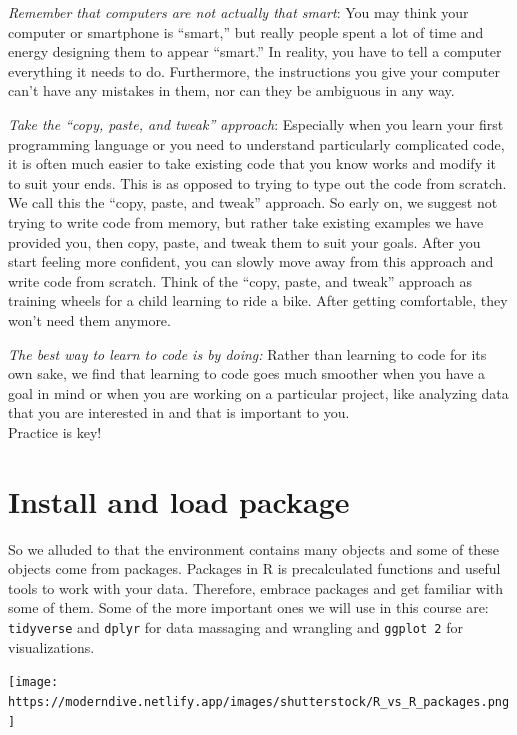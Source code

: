 \documentclass[
]{book}
\begin{document}
\emph{Remember that computers are not actually that smart}: You may
think your computer or smartphone is ``smart,'' but really people spent
a lot of time and energy designing them to appear ``smart.'' In reality,
you have to tell a computer everything it needs to do. Furthermore, the
instructions you give your computer can't have any mistakes in them, nor
can they be ambiguous in any way.

\emph{Take the ``copy, paste, and tweak'' approach}: Especially when you
learn your first programming language or you need to understand
particularly complicated code, it is often much easier to take existing
code that you know works and modify it to suit your ends. This is as
opposed to trying to type out the code from scratch. We call this the
``copy, paste, and tweak'' approach. So early on, we suggest not trying
to write code from memory, but rather take existing examples we have
provided you, then copy, paste, and tweak them to suit your goals. After
you start feeling more confident, you can slowly move away from this
approach and write code from scratch. Think of the ``copy, paste, and
tweak'' approach as training wheels for a child learning to ride a bike.
After getting comfortable, they won't need them anymore.

\emph{The best way to learn to code is by doing:} Rather than learning
to code for its own sake, we find that learning to code goes much
smoother when you have a goal in mind or when you are working on a
particular project, like analyzing data that you are interested in and
that is important to you.\\
Practice is key!

\hypertarget{installpackages}{%
\section{Install and load package}\label{installpackages}}

So we alluded to that the environment contains many objects and some of
these objects come from packages. Packages in R is precalculated
functions and useful tools to work with your data. Therefore, embrace
packages and get familiar with some of them. Some of the more important
ones we will use in this course are: \texttt{tidyverse} and
\texttt{dplyr} for data massaging and wrangling and \texttt{ggplot\ 2}
for visualizations.

\texttt{[image: https://moderndive.netlify.app/images/shutterstock/R\_vs\_R\_packages.png]}
\end{document}
